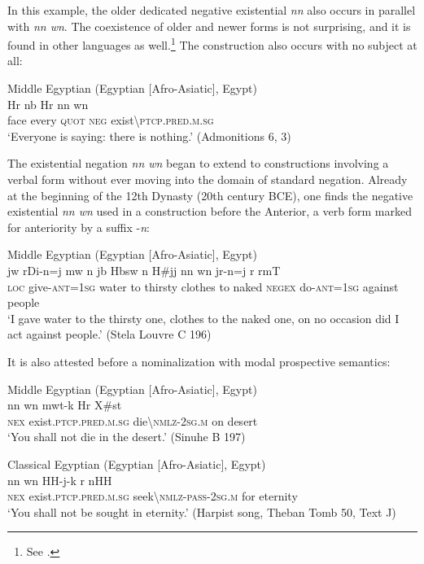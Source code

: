 \documentclass[output=paper]{langsci/langscibook}
\begin{document}
In this example, the older dedicated negative existential \textit{nn} also occurs in parallel with \textit{nn wn}. The coexistence of older and newer forms is not surprising, and it is found in other languages as well.\footnote{See \citet{Veselinova2014}.} 
The construction also occurs with no subject at all:  
 
\ea Middle Egyptian (Egyptian [Afro-Asiatic], Egypt) \label{ex:AE40}\\
    \gll Hr nb Hr nn wn\\ 
    face every \textsc{quot} \textsc{neg} exist\textbackslash\textsc{ptcp.pred.m.sg}\\ 
    \glt ‘Everyone is saying: there is nothing.’ (Admonitions 6, 3)
\z 
 
The existential negation \textit{nn wn} began to extend to constructions involving a verbal form without ever moving into the domain of standard negation. Already at the beginning of the 12th Dynasty (20th century BCE), one finds the negative existential \textit{nn wn} used in a construction before the Anterior, a verb form marked for anteriority by a suffix -\textit{n}:  
 
\ea Middle Egyptian (Egyptian [Afro-Asiatic], Egypt) \label{ex:AE41}\\
    \gll jw rDi-n=j mw n jb Hbsw n H\#jj nn wn jr-n=j r rmT\\ 
    \textsc{loc} give-\textsc{ant=1sg} water to thirsty clothes to naked \textsc{negex} do-\textsc{ant=1sg} against people\\ 
    \glt ‘I gave water to the thirsty one, clothes to the naked one, on no occasion did I act against people.’ (Stela Louvre C 196) 
\z {}
 
It is also attested before a nominalization with modal prospective semantics: 
 
\ea Middle Egyptian (Egyptian [Afro-Asiatic], Egypt) \label{ex:AE42}\\
    \gll nn wn mwt-k Hr X\#st\\ 
    \textsc{nex} exist.\textsc{ptcp.pred.m.sg} die\textbackslash\textsc{nmlz-2sg.m} on desert\\ 
    \glt ‘You shall not die in the desert.’ (Sinuhe B 197) 
\z 

\ea Classical Egyptian (Egyptian [Afro-Asiatic], Egypt) \label{ex:AE43}\\
    \gll nn wn HH-j-k r nHH\\ 
    \textsc{nex} exist.\textsc{ptcp.pred.m.sg} seek\textbackslash\textsc{nmlz-pass-2sg.m} for eternity\\ 
    \glt ‘You shall not be sought in eternity.’ (Harpist song, Theban Tomb 50, Text J)
\z 
 
\end{document}
